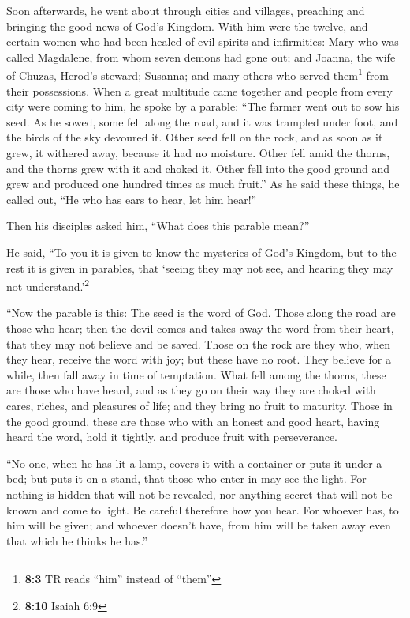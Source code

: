  Soon afterwards, he went about through cities and
villages, preaching and bringing the good news of God's Kingdom. With
him were the twelve,  and certain women who had been
healed of evil spirits and infirmities: Mary who was called Magdalene,
from whom seven demons had gone out;  and Joanna, the wife
of Chuzas, Herod's steward; Susanna; and many others who served
them\footnote{\textbf{8:3} TR reads ``him'' instead of ``them''} from
their possessions.  When a great multitude came together
and people from every city were coming to him, he spoke by a parable:
 ``The farmer went out to sow his seed. As he sowed, some
fell along the road, and it was trampled under foot, and the birds of
the sky devoured it.  Other seed fell on the rock, and as
soon as it grew, it withered away, because it had no moisture.
 Other fell amid the thorns, and the thorns grew with it
and choked it.  Other fell into the good ground and grew
and produced one hundred times as much fruit.'' As he said these things,
he called out, ``He who has ears to hear, let him hear!''

 Then his disciples asked him, ``What does this parable
mean?''

 He said, ``To you it is given to know the mysteries of
God's Kingdom, but to the rest it is given in parables, that `seeing
they may not see, and hearing they may not understand.'\footnote{\textbf{8:10}
  Isaiah 6:9}

 ``Now the parable is this: The seed is the word of God.
 Those along the road are those who hear; then the devil
comes and takes away the word from their heart, that they may not
believe and be saved.  Those on the rock are they who,
when they hear, receive the word with joy; but these have no root. They
believe for a while, then fall away in time of temptation.
 What fell among the thorns, these are those who have
heard, and as they go on their way they are choked with cares, riches,
and pleasures of life; and they bring no fruit to maturity.
 Those in the good ground, these are those who with an
honest and good heart, having heard the word, hold it tightly, and
produce fruit with perseverance.

 ``No one, when he has lit a lamp, covers it with a
container or puts it under a bed; but puts it on a stand, that those who
enter in may see the light.  For nothing is hidden that
will not be revealed, nor anything secret that will not be known and
come to light.  Be careful therefore how you hear. For
whoever has, to him will be given; and whoever doesn't have, from him
will be taken away even that which he thinks he has.''

